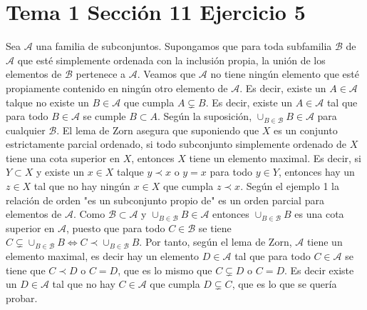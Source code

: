 \documentclass{article}
\begin{document}
\section{Tema 1 Sección 11 Ejercicio 5}
Sea $\mathcal{A}$ una familia de subconjuntos. Supongamos que para toda subfamilia $\mathcal{B}$ de $\mathcal{A}$ que esté simplemente ordenada con la inclusión propia, la unión de los elementos de $\mathcal{B}$ pertenece a $\mathcal{A}$. Veamos que $\mathcal{A}$ no tiene ningún elemento que esté propiamente contenido en ningún otro elemento de $\mathcal{A}$. Es decir, existe un $A\in \mathcal{A}$ talque no existe un $B\in \mathcal{A}$ que cumpla $A\subsetneq B$. Es decir, existe un $A\in \mathcal{A}$ tal que para todo $B\in \mathcal{A}$ se cumple $B\subset A$. Según la suposición, $\cup_{B\in \mathcal{B}}B\in \mathcal{A}$ para cualquier $\mathcal{B}$. El lema de Zorn asegura que suponiendo que $X$ es un conjunto estrictamente parcial ordenado, si todo subconjunto  simplemente ordenado de $X$ tiene una cota superior en $X$, entonces $X$ tiene un elemento maximal. Es decir, si $Y\subset X$ y  existe un $x\in X$ talque $y\prec x$ o $y=x$ para todo $y\in Y$, entonces hay un $z\in X$ tal que no hay ningún $x\in X$ que cumpla $z\prec x $. Según el ejemplo 1 la relación de orden "es un subconjunto propio de" es un orden parcial para elementos de $\mathcal{A}$. Como $\mathcal{B}\subset \mathcal{A}$ y $\cup_{B\in \mathcal{B}}B\in \mathcal{A}$ entonces $\cup_{B\in \mathcal{B}}B$ es una cota superior en $\mathcal{A}$, puesto que para todo $C\in \mathcal{B}$ se tiene $C\subsetneq \cup_{B\in \mathcal{B}}B\Leftrightarrow C\prec \cup_{B\in \mathcal{B}}B $. Por tanto, según el lema de Zorn, $\mathcal{A}$ tiene un elemento maximal, es decir hay un elemento $D\in \mathcal{A}$ tal que para todo $C\in \mathcal{A}$ se tiene que $C\prec D$ o $C=D$, que es lo mismo que $C\subsetneq D$ o $C=D$. Es decir existe un $D\in \mathcal{A}$ tal que no hay $C\in \mathcal{A}$ que cumpla $D\subsetneq C$, que es lo que se quería probar.
\end{document}
